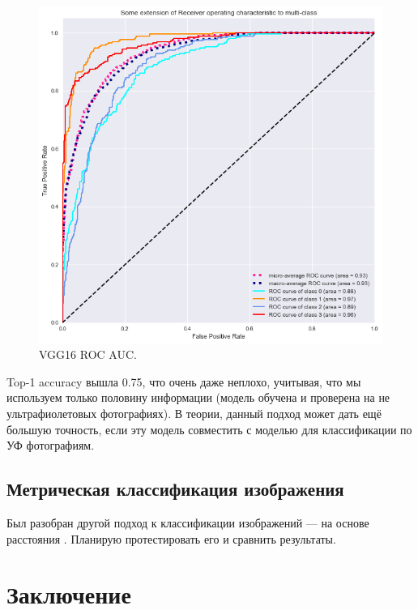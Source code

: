 \documentclass[14pt]{matmex-diploma}
\begin{document}
        \begin{figure}[h!]
            \centering
            \includegraphics[scale=0.6]{images/auc.png}
            \caption{VGG16 ROC AUC.}
            \label{auc}
        \end{figure}    
        
        Top-1 accuracy вышла 0.75, что очень даже неплохо, учитывая, что мы используем только половину информации (модель обучена и проверена на не ультрафиолетовых фотографиях). В теории, данный подход может дать ещё большую точность, если эту модель совместить с моделью для классификации по УФ фотографиям.


    \subsection{Метрическая классификация изображения}
        
        Был разобран другой подход к классификации изображений — на основе расстояния \cite{paper:oneshot}. Планирую протестировать его и сравнить результаты.
        
    

\section*{Заключение}
\end{document}
